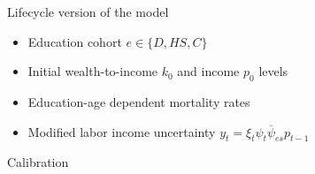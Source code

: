 \documentclass{beamer}
\begin{document}

\begin{frame}{Lifecycle version of the model}
\begin{itemize}
\item Education cohort $e \in \{D, HS, C\}$
\item Initial wealth-to-income $k_0$ and income $p_0$ levels
\item Education-age dependent mortality rates
\par \parencite{Brown2007}
\item Modified labor income uncertainty $y_t = \xi_t \psi_t \overline{\psi}_{es} p_{t-1}$
\par \parencite{Cagetti2003}
\end{itemize}
\end{frame}

\begin{frame}{Calibration}
\vfill
\begin{table}
  \centering
  \scriptsize 
  
\end{table}
\vfill
\end{frame}

\end{document}
